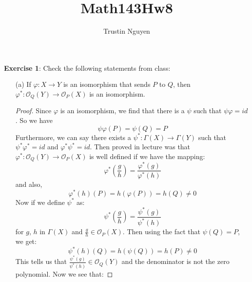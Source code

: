 \documentclass{article}
\title{Math143Hw8}
\author{Trustin Nguyen}
\begin{document}
    \maketitle

\reversemarginpar

\textbf{Exercise 1}: Check the following statements from class:
    \begin{itemize}
        \item [(a)] If $\varphi :X \rightarrow Y$ is an isomorphism that sends $P$ to $Q$, then $\varphi^{*}: \mathcal{O}_{Q}(Y) \rightarrow \mathcal{O}_{P}(X)$ is an isomorphism.
            \begin{proof}
                Since $\varphi$ is an isomorphism, we find that there is a $\psi$ such that $\psi\varphi = id$. So we have 
                    \begin{equation*}
                        \psi\varphi(P) = \psi(Q) = P
                    \end{equation*}
                Furthermore, we can say there exists a $\psi^{*} : \Gamma(X) \rightarrow \Gamma(Y)$ such that $\psi^{*}\varphi^{*} = id$ and $\varphi^{*}\psi^{*} = id$. Then proved in lecture was that $\varphi^{*}: \mathcal{O}_{Q}(Y) \rightarrow \mathcal{O}_{P}(X)$ is well defined if we have the mapping:
                    \begin{equation*}
                        \varphi^{*}(\dfrac{g}{h}) = \dfrac{\varphi^{*}(g)}{\varphi^{*}(h)}
                    \end{equation*}
                and also,
                    \begin{equation*}
                        \varphi^{*}(h)(P) = h(\varphi(P)) = h(Q) \neq 0
                    \end{equation*}
                Now if we define $\psi^{*}$ as:
                    \begin{equation*}
                        \psi^{*}(\dfrac{g}{h}) = \dfrac{\psi^{*}(g)}{\psi^{*}(h)}
                    \end{equation*}
                for $g$, $h$ in $\Gamma(X)$ and $\frac{g}{h} \in \mathcal{O}_{P}(X)$. Then using the fact that $\psi(Q) = P$, we get:
                    \begin{equation*}
                        \psi^{*}(h)(Q) = h(\psi(Q)) = h(P) \neq 0
                    \end{equation*}
                This tells us that $\frac{\psi^{*}(g)}{\psi^{*}(h)} \in \mathcal{O}_{Q}(Y)$ and the denominator is not the zero polynomial. Now we see that:

\end{proof}
\end{itemize}
\end{document}
